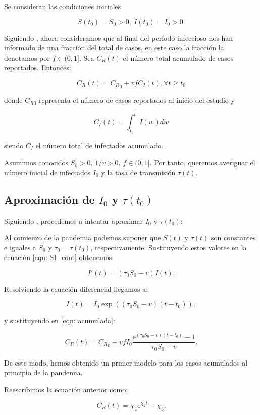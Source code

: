 Se consideran las condiciones iniciales

$$S(t_0)=S_0>0, \: I(t_0)=I_0>0.$$

Siguiendo \cite{demongeotSIEpidemicModel}, ahora consideramos que al final del período infeccioso nos han informado de una fracción del total de casos, en este caso la fracción la denotamos por $f\in (0,1]$. Sea $C_R(t)$ el número total acumulado de casos reportados. Entonces:

\begin{equation}
\label{eqn: acumulada}
C_R(t) = {C_R}_0 + vfC_I(t), \forall t \geq t_0
\end{equation}

donde $C_{R0}$ representa el número de casos reportados al inicio del estudio y 

$$C_I(t) = \int_{t_0}^t I(w) dw $$

siendo $C_I$ el número total de infectados acumulado.

Asumimos conocidos $S_0 > 0$, $1/v>0$, $f\in (0,1]$. Por tanto, queremos averiguar el número inicial de infectados $I_0$ y la tasa de transmisión $\tau (t)$.

\subsection{Aproximación de $I_0$ y $\tau (t_0)$}
Siguiendo \cite{demongeotSIEpidemicModel}, procedemos a intentar aproximar $I_0$ y $\tau (t_0)$:

Al comienzo de la pandemia podemos suponer que $S(t)$ y $\tau (t)$ son constantes e iguales a $S_0$ y $\tau_0 = \tau (t_0)$, respectivamente. Sustituyendo estos valores en la ecuación \eqref{eqn: SI_cont} obtenemos:

$$I'(t) = (\tau_0 S_0 -v) I(t).$$

Resolviendo la ecuación diferencial llegamos a:

$$I(t) = I_0\exp{((\tau_0 S_0-v)(t-t_0))},$$

y sustituyendo en \eqref{eqn: acumulada}:

$$C_R(t) = {C_R}_0 + vfI_0\frac{\mathrm{e}^{(\tau_0 S_0 -v)(t-t_0)} -1}{\tau_0 S_0-v}.$$

De este modo, hemos obtenido un primer modelo para los casos acumulados al principio de la pandemia.

Reescribimos la ecuación anterior como:

\begin{equation}
\label{eqn: acumulada_modelo}
C_R(t) = \chi_1 \mathrm{e}^{\chi_2 t} -\chi_3.
\end{equation}

